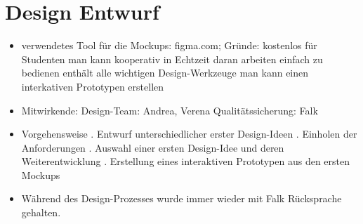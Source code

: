 \section{Design Entwurf}
\begin{itemize}
\item verwendetes Tool für die Mockups: figma.com; Gründe:
	\subitem kostenlos für Studenten
	\subitem man kann kooperativ in Echtzeit daran arbeiten
	\subitem einfach zu bedienen
	\subitem enthält alle wichtigen Design-Werkzeuge
	\subitem man kann einen interkativen Prototypen erstellen
\item Mitwirkende: 
	\subitem Design-Team: Andrea, Verena
	\subitem Qualitätssicherung: Falk
\item Vorgehensweise
	. Entwurf unterschiedlicher erster Design-Ideen
	. Einholen der Anforderungen
	. Auswahl einer ersten Design-Idee und deren Weiterentwicklung
	. Erstellung eines interaktiven Prototypen aus den ersten Mockups
\item Während des Design-Prozesses wurde immer wieder mit Falk Rücksprache gehalten.
\end{itemize}